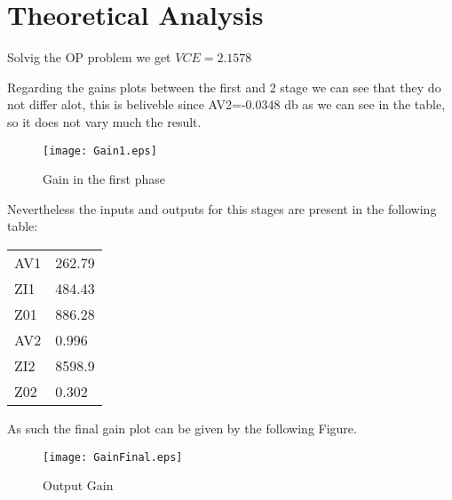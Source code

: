 
\newpage
\section{Theoretical Analysis}
\label{sec:analysis}

Solvig the OP problem we get $VCE=2.1578$

Regarding the gains plots between the first and 2 stage we can see that they do not differ alot, this is beliveble since AV2=-0.0348 db as we can see in the table, so it does not vary much the result.


\begin{figure}[h]
\centering
\texttt{[image: Gain1.eps]}
\caption{Gain in the first phase}
\label{plot:ganho1}
\end{figure}


Nevertheless the inputs and outputs for this stages are present in the following table:


\begin{table}[h]
\begin{tabular}{ll}
AV1 & 262.79 \\
ZI1 & 484.43 \\
Z01 & 886.28 \\
AV2 & 0.996  \\
ZI2 & 8598.9 \\
Z02 & 0.302 
\end{tabular}
\end{table}

\newpage

As such the final gain plot can be given by the following Figure.
\begin{figure}[h]
\centering
\texttt{[image: GainFinal.eps]}
\caption{Output Gain}
\label{plot:ganho2}
\end{figure}


